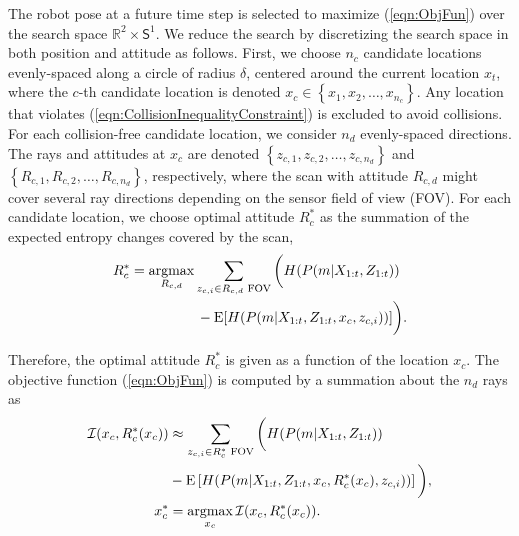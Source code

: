 \documentclass[letterpaper, 10pt]{ieeeconf}
\newcommand{\braces}[1]{\ensuremath{\left\{ #1 \right\}}}
\newcommand{\refeqn}[1]{(\ref{eqn:#1})}
\renewcommand{\Re}{\ensuremath{\mathbb{R}}}
\newcommand{\Sph}{\ensuremath{\mathsf{S}}}
\newcommand{\argmax}{\operatornamewithlimits{argmax}}
\begin{document}
The robot pose at a future time step is selected to maximize \refeqn{ObjFun} over the search space $\Re^2\times\Sph^1$. We reduce the search by discretizing the search space in both position and attitude as follows. First, we choose $n_c$ candidate locations evenly-spaced along a circle of radius $\delta$, centered around the current location $x_t$, where the $c$-th candidate location is denoted $x_c\in\braces{x_1,x_2,\ldots,x_{n_c}}$. Any location that violates \refeqn{CollisionInequalityConstraint} is excluded to avoid collisions. For each collision-free candidate location, we consider $n_d$ evenly-spaced directions. The rays and attitudes at $x_c$ are denoted $\braces{z_{c,1},z_{c,2},\ldots,z_{c,n_d}}$ and $\braces{R_{c,1},R_{c,2},\ldots,R_{c,n_d}}$, respectively, where the scan with attitude $R_{c,d}$ might cover several ray directions depending on the sensor field of view (FOV). For each candidate location, we choose optimal attitude $R_c^*$ as the summation of the expected entropy changes covered by the scan,
\begin{align}
\label{eqn:FindRc}
&R_c^*=\argmax_{R_{c,d}}\sum_{z_{c,i}\in R_{c,d}\text{ FOV}}\bigg(H(P(m|X_{1:t},Z_{1:t}))\nonumber\\&\qquad\quad\quad\quad\quad-\text{E}[H(P(m|X_{1:t},Z_{1:t},x_c,z_{c,i}))]\bigg).
\end{align}


Therefore, the optimal attitude $R_c^*$ is given as a function of the location $x_c$. The objective function \refeqn{ObjFun} is computed by a summation about the $n_d$ rays as %
\begin{align}
\label{eqn:ObjFunApprox}
\mathcal I(x_c,R_c^*(x_c))&\approx \sum_{z_{c,i}\in R_{c}^*\text{ FOV}}\bigg(H(P(m|X_{1:t},Z_{1:t}))\nonumber\\&-\text{E}\left[H(P(m|X_{1:t},Z_{1:t},x_c,R_c^*(x_c),z_{c,i}))\right]\bigg),
\\
x_c^*&=\argmax_{x_c}\mathcal I(x_c,R_c^*(x_c)).
\end{align}
\end{document}
